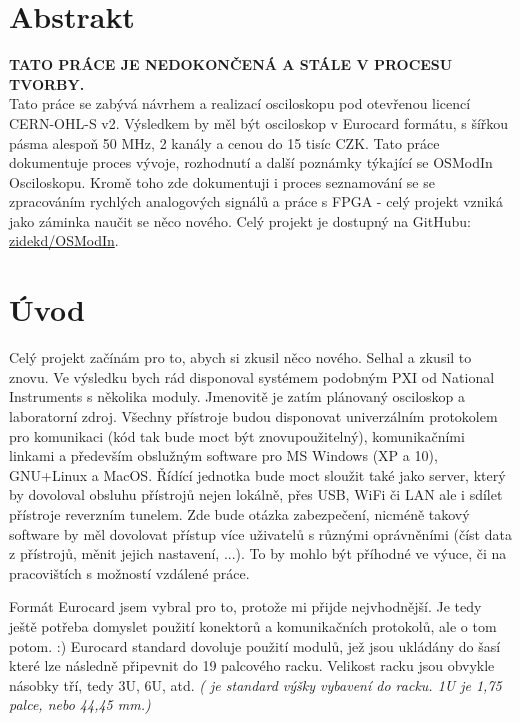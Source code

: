 \documentclass[12pt]{article}
\begin{document}
\newpage

\section{Abstrakt}

\textbf{TATO PRÁCE JE NEDOKONČENÁ A STÁLE V PROCESU TVORBY. }\\

Tato práce se zabývá návrhem a realizací osciloskopu pod otevřenou licencí CERN-OHL-S v2.
Výsledkem by měl být osciloskop v Eurocard formátu, s šířkou pásma alespoň 50 MHz, 
2 kanály a cenou do 15 tisíc CZK. Tato práce dokumentuje proces vývoje,
rozhodnutí a další poznámky týkající se OSModIn Osciloskopu. Kromě toho zde
dokumentuji i proces seznamování se se zpracováním rychlých analogových
signálů a práce s FPGA - celý projekt vzniká jako záminka naučit se něco nového.
Celý projekt je dostupný na GitHubu:
\href{https://github.com/zidekd/OSModIn}{zidekd/OSModIn}.

\newpage

\section{Úvod}

Celý projekt začínám pro to, abych si zkusil něco nového.
Selhal a zkusil to znovu. Ve výsledku bych rád disponoval systémem
podobným PXI od National Instruments s několika moduly.
Jmenovitě je zatím plánovaný osciloskop a laboratorní zdroj.
Všechny přístroje budou disponovat univerzálním protokolem pro
komunikaci (kód tak bude moct být znovupoužitelný), komunikačními
linkami a především obslužným software pro MS Windows (XP a 10),
GNU+Linux a MacOS. Řídící jednotka bude moct sloužit také jako server,
který by dovoloval obsluhu přístrojů nejen lokálně, přes USB, WiFi či LAN
ale i sdílet přístroje reverzním tunelem. Zde bude otázka zabezpečení,
nicméně takový software by měl dovolovat přístup více uživatelů s
různými oprávněními (číst data z přístrojů, měnit jejich nastavení, ...).
To by mohlo být příhodné ve výuce, či na pracovištích s možností vzdálené práce.

Formát Eurocard jsem vybral pro to, protože mi přijde nejvhodnější.
Je tedy ještě potřeba domyslet použití konektorů a komunikačních protokolů,
ale o tom potom. :) Eurocard standard dovoluje použití modulů, jež jsou
ukládány do šasí které lze následně připevnit do 19 palcového racku. Velikost
racku jsou obvykle násobky tří, tedy 3U, 6U, atd.
\emph{( je standard výšky vybavení do racku. 1U je 1,75 palce, nebo 44,45 mm.)}
\end{document}
